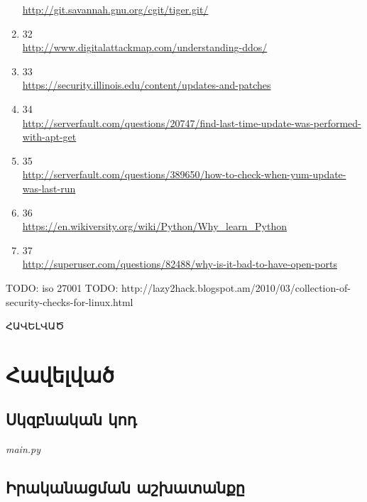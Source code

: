 \documentclass[12pt]{article}
\begin{document}
\begin{sloppypar}
\begin{enumerate}
	\url{http://git.savannah.gnu.org/cgit/tiger.git/}
\item 32 \\
	\url{http://www.digitalattackmap.com/understanding-ddos/}
\item 33 \\
	\url{https://security.illinois.edu/content/updates-and-patches}
\item 34 \\
	\url{http://serverfault.com/questions/20747/find-last-time-update-was-performed-with-apt-get}
\item 35 \\
	\url{http://serverfault.com/questions/389650/how-to-check-when-yum-update-was-last-run}
\item 36 \\
	\url{https://en.wikiversity.org/wiki/Python/Why\_learn\_Python}
\item 37 \\
	\url{http://superuser.com/questions/82488/why-is-it-bad-to-have-open-ports}
\end{enumerate}


TODO: iso 27001
TODO: http://lazy2hack.blogspot.am/2010/03/collection-of-security-checks-for-linux.html




\newpage
{}
\vspace*{\fill}
\begingroup
\centering
\centerline{\Huge{ՀԱՎԵԼՎԱԾ}}
\endgroup
\vspace*{\fill}
\newpage

\section*{Հավելված}
\subsection*{Սկզբնական կոդ}

\textit{main.py}
%

\newpage
\subsection*{Իրականացման աշխատանքը}

\end{sloppypar}
\end{document}
